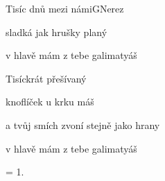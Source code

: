 \begin{song}{Tisíc dnů mezi námi}{G}{Nerez}
\begin{SBVerse}
sladká jak hrušky planý

v hlavě mám z tebe galimatyáš

\end{SBVerse}

\begin{SBVerse}

Tisíckrát přešívaný

knoflíček u krku máš

a tvůj smích zvoní stejně jako hrany

v hlavě mám z tebe galimatyáš

\end{SBVerse}

\begin{SBVerse} = 1.\end{SBVerse}

\begin{SBChorus}

\end{SBChorus}

\end{song}

\clearpage
